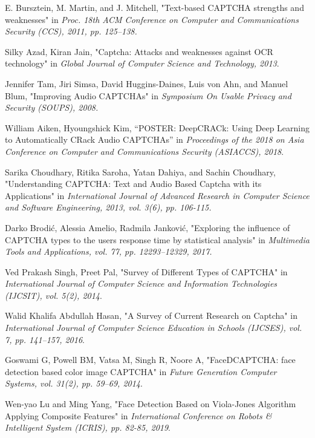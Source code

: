 \begin{thebibliography}{9}
 E. Bursztein, M. Martin, and J. Mitchell, "Text-based CAPTCHA strengths and weaknesses" in \emph{Proc. 18th ACM Conference on Computer and Communications Security (CCS), 2011, pp. 125–138.}

 Silky Azad, Kiran Jain, "Captcha: Attacks and weaknesses against OCR technology" in \emph{Global Journal of Computer Science and Technology, 2013}.

 Jennifer Tam, Jiri Simsa, David Huggins-Daines, Luis von Ahn, and Manuel Blum, "Improving Audio CAPTCHAs" in \emph{Symposium On Usable Privacy and Security (SOUPS), 2008.}

 William Aiken, Hyoungshick Kim, “POSTER: DeepCRACk: Using Deep Learning to Automatically CRack Audio CAPTCHAs” in \emph{Proceedings of the 2018 on Asia Conference on Computer and Communications Security (ASIACCS), 2018}.

 Sarika Choudhary, Ritika Saroha, Yatan Dahiya, and Sachin Choudhary, "Understanding CAPTCHA: Text and Audio Based Captcha with its Applications" in \emph{International Journal of Advanced Research in Computer Science and Software Engineering, 2013, vol. 3(6), pp. 106-115.}

 Darko Brodi\'c, Alessia Amelio, Radmila Jankovi\'c, "Exploring the influence of CAPTCHA types to the users response time by statistical analysis" in \emph{Multimedia Tools and Applications, vol. 77, pp. 12293–12329, 2017.}

 Ved Prakash Singh, Preet Pal, "Survey of Different Types of CAPTCHA" in \emph{International Journal of Computer Science and Information Technologies (IJCSIT), vol. 5(2), 2014}.

 Walid Khalifa Abdullah Hasan, "A Survey of Current Research on Captcha" in \emph{International Journal of Computer Science Education in Schools (IJCSES), vol. 7, pp. 141–157, 2016}.

 Goswami G, Powell BM, Vatsa M, Singh R, Noore A, "FaceDCAPTCHA: face detection based color image CAPTCHA" in \emph{Future Generation Computer Systems, vol. 31(2), pp. 59–69, 2014}.

 Wen-yao Lu and Ming Yang, "Face Detection Based on Viola-Jones Algorithm Applying Composite Features" in \emph{International Conference on Robots \& Intelligent System (ICRIS), pp. 82-85, 2019}.


\end{thebibliography}
